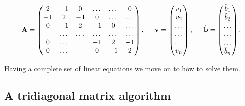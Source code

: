 \documentclass[11pt,a4paper,english,final]{article}
\numberwithin{equation}{section}
\newcommand{\ve}[1]{\mathbf{#1}} %
\newcommand{\spac}{\hspace{5mm}}
\begin{document}
\begin{gather*}
    \ve{A} = \begin{pmatrix}
                           2& -1& 0 &\dots   & \dots &0 \\
                           -1 & 2 & -1 &0 &\dots &\dots \\
                           0&-1 &2 & -1 & 0 & \dots \\
                           & \dots   & \dots &\dots   &\dots & \dots \\
                           0&\dots   &  &-1 &2& -1 \\
                           0&\dots    &  & 0  &-1 & 2 \\
                      \end{pmatrix},\spac \ve{v} = \begin{pmatrix}
                           v_1\\
                           v_2\\
                           \dots \\
                          \dots  \\
                          \dots \\
                           v_n\\
                      \end{pmatrix},
  \spac \tilde{\ve{b}} = \begin{pmatrix}
                           \tilde{b}_1\\
                           \tilde{b}_2\\
                           \dots \\
                           \dots \\
                          \dots \\
                           \tilde{b}_n\\
                      \end{pmatrix}.
\end{gather*}

Having a complete set of linear equations we move on to how to solve them.

\subsection{A tridiagonal matrix algorithm}
\label{subsec:Thomas}
\end{document}

